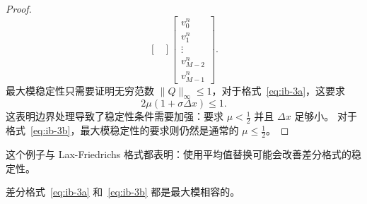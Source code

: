 \begin{proof}
\[\begin{bmatrix}
        \end{bmatrix}
        \begin{bmatrix}
            v_0^{n} \\ v_1^{n} \\ \vdots \\ v_{M-2}^{n} \\ v_{M-1}^{n}
        \end{bmatrix}.
    \]
    最大模稳定性只需要证明无穷范数 $\|Q\|_{\infty} \le 1$，对于格式~\eqref{eq:ib-3a}，这要求
    \[
        2 \mu (1 + \sigma \Delta x) \le 1.
    \]
    这表明边界处理导致了稳定性条件需要加强：要求 $\mu < \frac12$ 并且 $\Delta x $ 足够小。
    对于格式~\eqref{eq:ib-3b}，最大模稳定性的要求则仍然是通常的 $\mu \le \frac12$。
\end{proof}

\begin{remark}
    这个例子与 Lax-Friedrichs 格式都表明：使用平均值替换可能会改善差分格式的稳定性。
\end{remark}


\begin{example}
    差分格式~\eqref{eq:ib-3a} 和~\eqref{eq:ib-3b} 都是最大模相容的。
\end{example}

